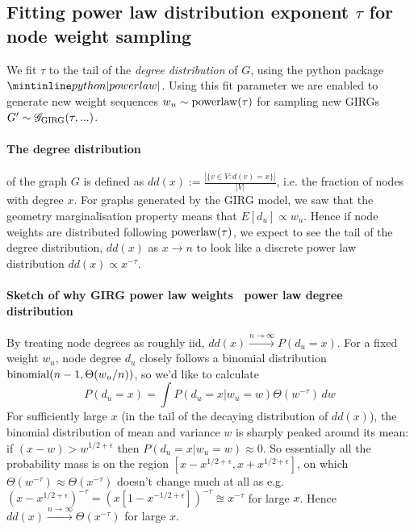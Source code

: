 


\subsection{Fitting power law distribution exponent $\tau$ for node weight sampling}
We fit $\tau$ to the tail of the \textit{degree distribution} of $G$, using the python package $\PLP$. Using this fit parameter we are enabled to generate new weight sequences $w_u \sim \operatorname{powerlaw}(\tau)$ for sampling new GIRGs $G' \sim \mathscr{G}_{\mathrm{GIRG}}(\tau,...)$.

\paragraph{The degree distribution} of the graph $G$ is defined as $dd(x) := \frac{|\{v \in V: d(v) = x\}|}{|V|}$, i.e. the fraction of nodes with degree $x$. For graphs generated by the GIRG model, we saw that the geometry marginalisation property means that $E[d_u] \propto w_u$. Hence if node weights are distributed following $\operatorname{powerlaw}(\tau)$, we expect to see the tail of the degree distribution, $dd(x)$ as $x \to n$ to look like a discrete power law distribution $dd(x) \propto x^{-\tau}$.

\paragraph{Sketch of why GIRG power law weights \textrightarrow\ power law degree distribution}  
By treating node degrees as roughly iid, $dd(x) \stackrel{n \to \infty}{\to} P(d_u = x)$.
For a fixed weight $w_u$, node degree $d_u$ closely follows a binomial distribution $\operatorname{binomial}(n-1, \Theta(w_u / n))$, so we'd like to calculate 
\begin{equation}
    P(d_u = x) = \int P(d_u = x | w_u = w) \Theta(w^{-\tau}) \,dw
\end{equation}
For sufficiently large $x$ (in the tail of the decaying distribution of $dd(x)$), the binomial distribution of mean and variance $w$ is sharply peaked around its mean: if $(x-w) > w^{1/2 + \epsilon}$ then $P(d_u = x | w_u = w) \approx 0$. 
So essentially all the probability mass is on the region $[x - x^{1/2 + \epsilon}, x + x^{1/2 + \epsilon}]$, on which $\Theta(w^{-\tau}) \approx \Theta(x^{-\tau})$ doesn't change much at all as e.g. $(x - x^{1/2 + \epsilon})^{-\tau} = (x[1 - x^{-1/2 + \epsilon}])^{-\tau} \approxeq x^{-\tau}$ for large $x$.
Hence $dd(x) \stackrel{n \to \infty}{\to} \Theta(x^{-\tau})$ for large $x$.


